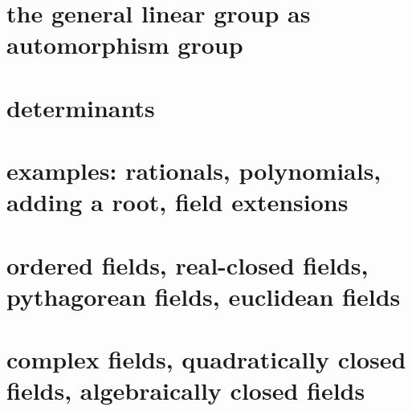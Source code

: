 \section{the general linear group as automorphism group}
\section{determinants\titledagger}
\section{examples: rationals, polynomials, adding a root, field extensions}
\section{ordered fields, real-closed fields, pythagorean fields, euclidean fields}
\section{complex fields, quadratically closed fields, algebraically closed fields}


